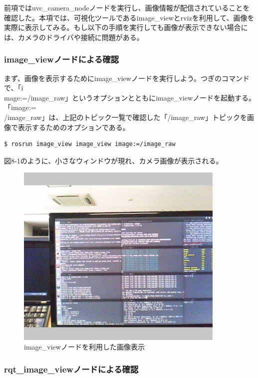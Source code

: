 前項ではuvc\_camera\_nodeノードを実行し、画像情報が配信されていることを確認した。本項では、可視化ツールであるimage\_viewとrvizを利用して、画像を実際に表示してみる。もし以下の手順を実行しても画像が表示できない場合には、カメラのドライバや接続に問題がある。

\subsubsection{image\_viewノードによる確認}

まず、画像を表示するためにimage\_viewノードを実行しよう。つぎのコマンドで、「i\\mage:=/image\_raw」というオプションとともにimage\_viewノードを起動する。「image:=\\/image\_raw」は、上記のトピック一覧で確認した「/image\_raw」トピックを画像で表示するためのオプションである。

\begin{lstlisting}[language=ROS]
$ rosrun image_view image_view image:=/image_raw
\end{lstlisting}

図8-1のように、小さなウィンドウが現れ、カメラ画像が表示される。

\begin{figure}[htp]
  \centering
  \includegraphics[width=10cm]{pictures/chapter8/pic_08_01.png}
  \caption{image\_viewノードを利用した画像表示}
\end{figure}

\subsubsection{rqt\_image\_viewノードによる確認}

